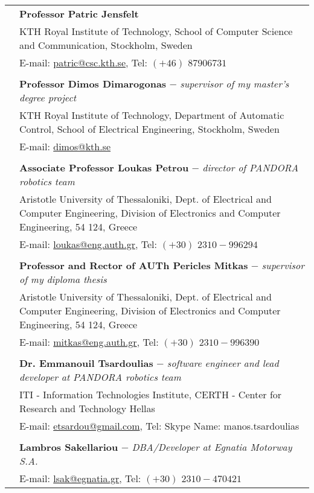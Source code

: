 \documentclass[a4paper,10pt,twoside]{article}
\begin{document}
\begin{tabular}{rp{14cm}}
& \textbf{Professor Patric Jensfelt}\\
&KTH Royal Institute of Technology, School of Computer Science and Communication, Stockholm, Sweden \\
& E-mail: \href{mailto: patric@csc.kth.se}{patric@csc.kth.se}, Tel: $(+46)$ $8 790 67 31$ \\
&\\
  & \textbf{Professor Dimos Dimarogonas} $-$ \textit{supervisor of my master's degree project}\\
&KTH Royal Institute of Technology, Department of Automatic Control, School of Electrical Engineering, Stockholm, Sweden \\
& E-mail: \href{mailto: dimos@kth.se}{dimos@kth.se} \\
&\\
& \textbf{Associate Professor Loukas Petrou} $-$ \textit{director of PANDORA robotics team}\\
&Aristotle University of Thessaloniki, Dept. of Electrical and Computer Engineering,
Division of Electronics and Computer Engineering, 54 124, Greece \\
& E-mail: \href{mailto: loukas@eng.auth.gr}{loukas@eng.auth.gr}, Tel: $(+30)$ $2310-996294$ \\
&\\
  & \textbf{Professor and Rector of AUTh Pericles Mitkas} $-$ \textit{supervisor of my diploma thesis}\\
&Aristotle University of Thessaloniki, Dept. of Electrical and Computer Engineering,
Division of Electronics and Computer Engineering, 54 124, Greece \\
& E-mail: \href{mailto:mitkas@eng.auth.gr}{mitkas@eng.auth.gr}, Tel: $(+30)$ $2310-996390$ \\
&\\
& \textbf{Dr. Emmanouil Tsardoulias} $-$ \textit{software engineer and lead developer at PANDORA robotics team}\\
& ITI - Information Technologies Institute, CERTH - Center for Research and Technology Hellas \\
& E-mail: \href{mailto:etsardou@gmail.com}{etsardou@gmail.com}, Tel: Skype Name: manos.tsardoulias \\
&\\
& \textbf{Lambros Sakellariou} $-$ \textit{DBA/Developer at Egnatia Motorway S.A.}\\
& E-mail: \href{mailto:lsak@egnatia.gr}{lsak@egnatia.gr}, Tel: $(+30)$ $2310 - 470421$ \\

\end{tabular}
\end{document}
